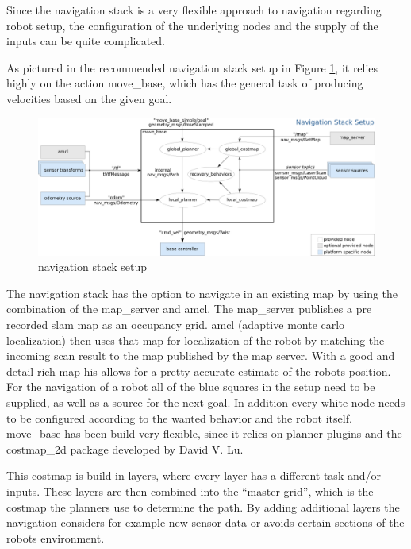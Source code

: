 Since the navigation stack is a very flexible approach to navigation regarding robot setup, the configuration of the underlying nodes and the supply of the inputs can be quite complicated\cite{nav}.

As pictured in the recommended navigation stack setup in Figure \ref{navigation stack setup}, it relies highly on the action move\_base, which has the general task of producing velocities based on the given goal.

\begin{figure}[H]
	\centering
	\includegraphics[width=\textwidth]{Pictures/navigation stack setup}
	\caption{navigation stack setup\cite{movebase}}
	
	\label{navigation stack setup}
\end{figure}

The navigation stack has the option to navigate in an existing map by using the combination of the map\_server and amcl. The map\_server publishes a pre recorded slam map as an occupancy grid. amcl (adaptive monte carlo localization) then uses that map for localization of the robot by matching the incoming scan result to the map published by the map server. With a good and detail rich map his allows for a pretty accurate estimate of the robots position.\\

For the navigation of a robot all of the blue squares in the setup need to be supplied, as well as a source for the next goal. In addition every white node needs to be configured according to the wanted behavior and the robot itself.\\

move\_base has been build very flexible, since it relies on planner plugins and the costmap\_2d package developed by David V. Lu.

This costmap is build in layers, where every layer has a different task and/or inputs. These layers are then combined into the ``master grid'', which is the costmap the planners use to determine the path\cite{costmappaper}. By adding additional layers the navigation considers for example new sensor data or avoids certain sections of the robots environment.

